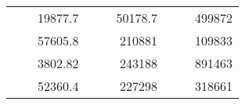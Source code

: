 \begin{table}[H]
\begin{tabular}{|ccrccrccc}
\rowcolor[HTML]{DDFDFF} 
\multicolumn{1}{|c|}{\cellcolor[HTML]{FFFFC7}}                                & \multicolumn{1}{c|}{\cellcolor[HTML]{DDFDFF}}                      & \multicolumn{1}{r|}{\cellcolor[HTML]{DAE8FC}19877.7}   & \multicolumn{1}{c|}{\cellcolor[HTML]{FFFFC7}}                                & \multicolumn{1}{c|}{\cellcolor[HTML]{DDFDFF}}                       & \multicolumn{1}{r|}{\cellcolor[HTML]{DDFDFF}50178.7}   & \multicolumn{1}{c|}{\cellcolor[HTML]{FFFFC7}}                                & \multicolumn{1}{c|}{\cellcolor[HTML]{DDFDFF}}                      & \multicolumn{1}{r|}{\cellcolor[HTML]{DDFDFF}499872}    \\ \cline{3-3} \cline{6-6} \cline{9-9} 
\multicolumn{1}{|c|}{\cellcolor[HTML]{FFFFC7}}                                & \multicolumn{1}{c|}{\cellcolor[HTML]{DDFDFF}}                      & \multicolumn{1}{r|}{\cellcolor[HTML]{DDFDFF}57605.8}   & \multicolumn{1}{c|}{\cellcolor[HTML]{FFFFC7}}                                & \multicolumn{1}{c|}{\cellcolor[HTML]{DDFDFF}}                       & \multicolumn{1}{r|}{\cellcolor[HTML]{DAE8FC}210881}    & \multicolumn{1}{c|}{\cellcolor[HTML]{FFFFC7}}                                & \multicolumn{1}{c|}{\cellcolor[HTML]{DDFDFF}}                      & \multicolumn{1}{r|}{\cellcolor[HTML]{DAE8FC}109833}    \\ \cline{3-3} \cline{6-6} \cline{9-9} 
\rowcolor[HTML]{DDFDFF} 
\multicolumn{1}{|c|}{\cellcolor[HTML]{FFFFC7}}                                & \multicolumn{1}{c|}{\cellcolor[HTML]{DDFDFF}}                      & \multicolumn{1}{r|}{\cellcolor[HTML]{DAE8FC}3802.82}   & \multicolumn{1}{c|}{\cellcolor[HTML]{FFFFC7}}                                & \multicolumn{1}{c|}{\cellcolor[HTML]{DDFDFF}}                       & \multicolumn{1}{r|}{\cellcolor[HTML]{DDFDFF}243188}    & \multicolumn{1}{c|}{\cellcolor[HTML]{FFFFC7}}                                & \multicolumn{1}{c|}{\cellcolor[HTML]{DDFDFF}}                      & \multicolumn{1}{r|}{\cellcolor[HTML]{DDFDFF}891463}    \\ \cline{3-3} \cline{6-6} \cline{9-9} 
\multicolumn{1}{|c|}{\cellcolor[HTML]{FFFFC7}}                                & \multicolumn{1}{c|}{\cellcolor[HTML]{DDFDFF}}                      & \multicolumn{1}{r|}{\cellcolor[HTML]{DDFDFF}52360.4}   & \multicolumn{1}{c|}{\cellcolor[HTML]{FFFFC7}}                                & \multicolumn{1}{c|}{\cellcolor[HTML]{DDFDFF}}                       & \multicolumn{1}{r|}{\cellcolor[HTML]{DAE8FC}227298}    & \multicolumn{1}{c|}{\cellcolor[HTML]{FFFFC7}}                                & \multicolumn{1}{c|}{\cellcolor[HTML]{DDFDFF}}                      & \multicolumn{1}{r|}{\cellcolor[HTML]{DAE8FC}318661}    \\ \cline{3-3} \cline{6-6} \cline{9-9} 

\end{tabular}
\end{table}
